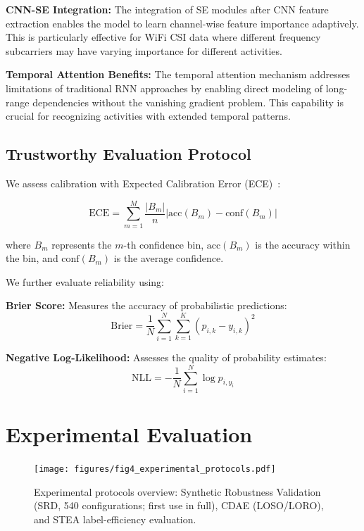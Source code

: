 \documentclass[journal]{IEEEtran}
\begin{document}
\textbf{CNN-SE Integration:} The integration of SE modules after CNN feature extraction enables the model to learn channel-wise feature importance adaptively. This is particularly effective for WiFi CSI data where different frequency subcarriers may have varying importance for different activities.

\textbf{Temporal Attention Benefits:} The temporal attention mechanism addresses limitations of traditional RNN approaches by enabling direct modeling of long-range dependencies without the vanishing gradient problem. This capability is crucial for recognizing activities with extended temporal patterns.

\subsection{Trustworthy Evaluation Protocol}

We assess calibration with Expected Calibration Error (ECE)~\cite{calibration_guo2017}:

\begin{equation}
\text{ECE} = \sum_{m=1}^{M} \frac{|B_m|}{n} |\text{acc}(B_m) - \text{conf}(B_m)|
\end{equation}

where $B_m$ represents the $m$-th confidence bin, $\text{acc}(B_m)$ is the accuracy within the bin, and $\text{conf}(B_m)$ is the average confidence.

We further evaluate reliability using:

\textbf{Brier Score:} Measures the accuracy of probabilistic predictions:
\begin{equation}
\text{Brier} = \frac{1}{N} \sum_{i=1}^{N} \sum_{k=1}^{K} (p_{i,k} - y_{i,k})^2
\end{equation}

\textbf{Negative Log-Likelihood:} Assesses the quality of probability estimates:
\begin{equation}
\text{NLL} = -\frac{1}{N} \sum_{i=1}^{N} \log p_{i,y_i}
\end{equation}

\section{Experimental Evaluation}

\begin{figure}[t]
\centering
\texttt{[image: figures/fig4\_experimental\_protocols.pdf]}
\caption{Experimental protocols overview: Synthetic Robustness Validation (SRD, 540 configurations; first use in full), CDAE (LOSO/LORO), and STEA label-efficiency evaluation.}
\label{fig:protocols}
\end{figure}
\end{document}
